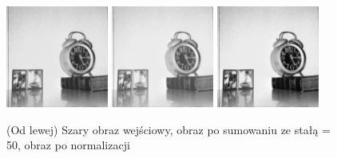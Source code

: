 \documentclass[final,a4paper,openany,12pt]{mwbk}
\begin{document}
\begin{figure}[H]
	\begin{center}
		\includegraphics[width=0.3\textwidth]{1/1Gray_Const_Sum_Original}
		\includegraphics[width=0.3\textwidth]{1/1Gray_Const_Sum_Result}
		\includegraphics[width=0.3\textwidth]{1/1Gray_Const_Sum_Result_Norm}
	\end{center}
	\caption{(Od lewej) Szary obraz wejściowy, obraz po sumowaniu ze stałą = 50, obraz po normalizacji }
\end{figure}
\end{document}
